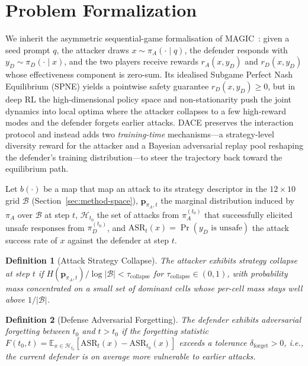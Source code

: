 \documentclass{article}
\newtheorem{definition}{Definition}
\newcommand{\method}{\textsc{DACE}\xspace}
\newcommand{\piA}{\pi_A}
\newcommand{\piD}{\pi_D}
\newcommand{\strategyspace}{\mathcal{B}}
\begin{document}
\section{Problem Formalization}
\label{sec:formalization}

We inherit the asymmetric sequential-game formalisation of MAGIC~\citep{magic2025}: given a seed prompt $q$, the attacker draws $x \sim \piA(\cdot\mid q)$, the defender responds with $y_D \sim \piD(\cdot\mid x)$, and the two players receive rewards $r_A(x, y_D)$ and $r_D(x, y_D)$ whose effectiveness component is zero-sum. Its idealised Subgame Perfect Nash Equilibrium (SPNE) yields a pointwise safety guarantee $r_D(x, y_D) \geq 0$, but in deep RL the high-dimensional policy space and non-stationarity push the joint dynamics into local optima where the attacker collapses to a few high-reward modes and the defender forgets earlier attacks. \method preserves the interaction protocol and instead adds two \emph{training-time} mechanisms---a strategy-level diversity reward for the attacker and a Bayesian adversarial replay pool reshaping the defender's training distribution---to steer the trajectory back toward the equilibrium path.

Let $b(\cdot)$ be a map that map an attack to its strategy descriptor in the $12\times10$ grid $\strategyspace$ (Section~\ref{sec:method-space}), $\mathbf{p}_{\piA,t}$ the marginal distribution induced by $\piA$ over $\strategyspace$ at step $t$, $\mathcal{H}_{t_0}$ the set of attacks from $\piA^{(t_0)}$ that successfully elicited unsafe responses from $\piD^{(t_0)}$, and $\mathrm{ASR}_t(x) = \Pr(y_D \text{ is unsafe})$ the attack success rate of $x$ against the defender at step $t$.

\begin{definition}[Attack Strategy Collapse]
\label{def:collapse}
The attacker exhibits \emph{strategy collapse} at step $t$ if $H(\mathbf{p}_{\piA,t}) / \log|\strategyspace| < \tau_{\mathrm{collapse}}$ for $\tau_{\mathrm{collapse}} \in (0,1)$, with probability mass concentrated on a small set of dominant cells whose per-cell mass stays well above $1/|\strategyspace|$.
\end{definition}

\begin{definition}[Defense Adversarial Forgetting]
\label{def:forgetting}
The defender exhibits \emph{adversarial forgetting} between $t_0$ and $t > t_0$ if the forgetting statistic $F(t_0, t) = \mathbb{E}_{x\in\mathcal{H}_{t_0}}\!\left[\mathrm{ASR}_t(x) - \mathrm{ASR}_{t_0}(x)\right]$ exceeds a tolerance $\delta_{\mathrm{forget}} > 0$, i.e., the current defender is on average more vulnerable to earlier attacks.
\end{definition}
\end{document}
